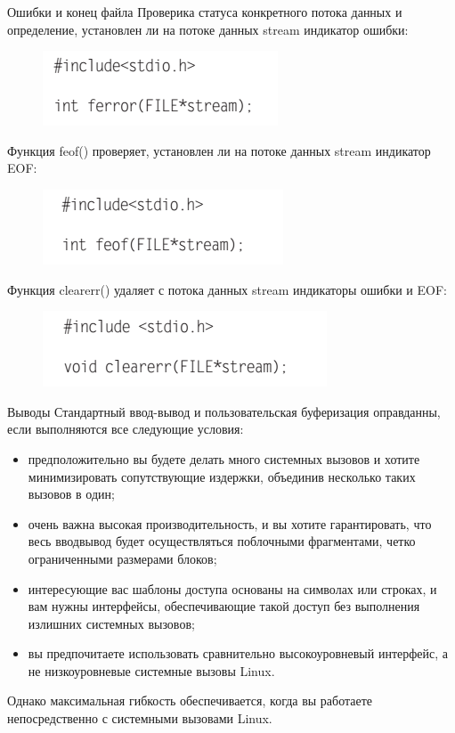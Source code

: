 \documentclass{beamer}
\begin{document}
\begin{frame}{Ошибки и конец файла}
Проверика статуса конкретного потока данных и определение, установлен ли на потоке данных
stream индикатор ошибки:
\begin{figure}[h]
\centering
\includegraphics[scale=0.6]{images/lec05-pic25.png}
\end{figure}
Функция feof() проверяет, установлен ли на потоке данных stream индикатор
EOF:
\begin{figure}[h]
\centering
\includegraphics[scale=0.6]{images/lec05-pic26.png}
\end{figure}
Функция clearerr() удаляет с потока данных stream индикаторы ошибки и EOF:
\begin{figure}[h]
\centering
\includegraphics[scale=0.6]{images/lec05-pic27.png}
\end{figure}
\end{frame}

\begin{frame}{Выводы}
Стандартный ввод-вывод и пользовательская буферизация оправданны, если выполняются все следующие условия:
\begin{itemize}
\item предположительно вы будете делать много системных вызовов и хотите минимизировать сопутствующие издержки, объединив несколько таких вызовов в один;
\item очень важна высокая производительность, и вы хотите гарантировать, что весь
ввод­вывод будет осуществляться поблочными фрагментами, четко ограниченными размерами блоков;
\item интересующие вас шаблоны доступа основаны на символах или строках, и вам
нужны интерфейсы, обеспечивающие такой доступ без выполнения излишних системных вызовов;
\item вы предпочитаете использовать сравнительно высокоуровневый интерфейс, а не
низкоуровневые системные вызовы Linux.
\end{itemize}
Однако максимальная гибкость обеспечивается, когда вы работаете непосредственно с системными вызовами Linux.
\end{frame}
\end{document}
